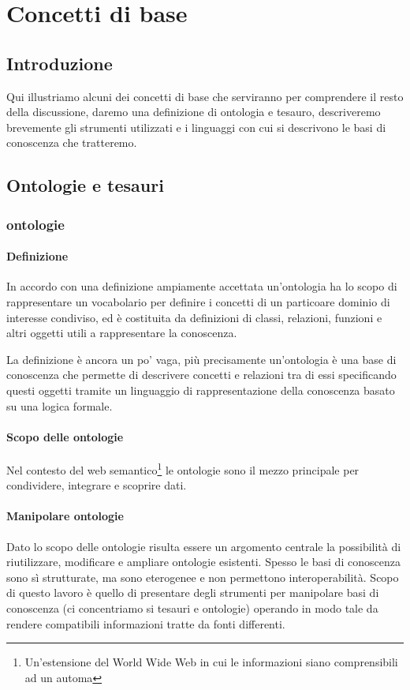 \chapter{Concetti di base}

\section*{Introduzione}
Qui illustriamo alcuni dei concetti di base che serviranno per comprendere il resto della discussione, daremo una definizione di ontologia e tesauro, descriveremo brevemente gli strumenti utilizzati e i linguaggi con cui si descrivono le basi di conoscenza che tratteremo.


\section{Ontologie e tesauri}

\subsection{ontologie}
\subsubsection{Definizione}
In accordo con una definizione ampiamente accettata \cite{hitzler2021review} un'ontologia ha lo scopo di rappresentare un vocabolario per definire i concetti di un particoare dominio di interesse condiviso, ed è costituita da definizioni di classi, relazioni, funzioni e altri oggetti utili a rappresentare la conoscenza\cite{gruber1993translation}. 

La definizione è ancora un po' vaga, più precisamente un'ontologia è una base di conoscenza che permette di descrivere concetti e relazioni tra di essi specificando questi oggetti tramite un linguaggio di rappresentazione della conoscenza basato su una logica formale.
\subsubsection{Scopo delle ontologie}
Nel contesto del web semantico\footnote{Un'estensione del World Wide Web in cui le informazioni siano comprensibili ad un automa\cite{berners2001new}} le ontologie sono il mezzo principale per condividere, integrare e scoprire dati\cite{hitzler2021review}.
\subsubsection{Manipolare ontologie}
 Dato lo scopo delle ontologie risulta essere un argomento centrale la possibilità di riutilizzare, modificare e ampliare ontologie esistenti. Spesso le basi di conoscenza sono sì strutturate, ma sono eterogenee e non permettono interoperabilità. Scopo di questo lavoro è quello di presentare degli strumenti per manipolare basi di conoscenza (ci concentriamo si tesauri e ontologie) operando in modo tale da rendere compatibili informazioni tratte da fonti differenti. 
 
